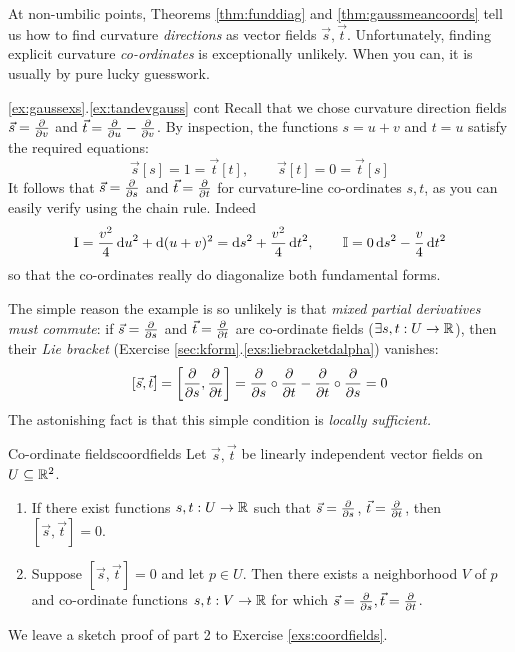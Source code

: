 
At non-umbilic points, Theorems \ref{thm:funddiag} and \ref{thm:gaussmeancoords} tell us how to find curvature \emph{directions} as vector fields $\vec s,\vec t$. Unfortunately, finding explicit curvature \emph{co-ordinates} is exceptionally unlikely. When you can, it is usually by pure lucky guesswork.

\begin{example*}{\ref*{ex:gaussexs}.\ref{ex:tandevgauss} cont}{}
	Recall that we chose curvature direction fields $\vec s=\frac{\partial }{\partial v}$ and $\vec t=\frac{\partial }{\partial u}-\frac{\partial }{\partial v}$. By inspection, the functions $s=u+v$ and $t=u$ satisfy the required equations:
	\[
		\vec s[s]=1=\vec t[t],\qquad \vec s[t]=0=\vec t[s]
	\]
	It follows that $\vec s=\frac{\partial }{\partial s}$ and $\vec t=\frac{\partial }{\partial t}$ for curvature-line co-ordinates $s,t$, as you can easily verify using the chain rule. Indeed
	\[
		\mathrm{I}=\frac{v^2}4\,{\mathrm{d} u}^2+\mathrm{d}(u+v)^2 ={\mathrm{d} s}^2+\frac{v^2}4\,{\mathrm{d} t}^2,\qquad \mathbb{I}=0\,{\mathrm{d} s}^2-\frac v4\,{\mathrm{d} t}^2
	\]
	so that the co-ordinates really do diagonalize both fundamental forms.
\end{example*}

 The simple reason the example is so unlikely is that \emph{mixed partial derivatives must commute}: if $\vec s=\frac{\partial }{\partial s}$ and $\vec t=\frac{\partial }{\partial t}$ are co-ordinate fields ($\exists s,t:U\to\mathbb{R}$), then their \emph{Lie bracket} (Exercise \ref*{sec:kform}.\ref{exs:liebracketdalpha}) vanishes:
\[
	[\vec s,\vec t]=\left[\frac{\partial }{\partial s},\frac{\partial }{\partial t}\right]=\frac{\partial }{\partial s}\circ\frac{\partial }{\partial t}-\frac{\partial }{\partial t}\circ\frac{\partial }{\partial s}=0
\]
The astonishing fact is that this simple condition is \emph{locally sufficient.}

\begin{thm}{Co-ordinate fields}{coordfields}
	Let $\vec s,\vec t$ be linearly independent vector fields on $U\subseteq\mathbb{R}^2$.
	\begin{enumerate}
	  \item If there exist functions $s,t:U\to\mathbb{R}$ such that $\vec s=\frac{\partial }{\partial s}$, $\vec t=\frac{\partial }{\partial t}$, then $[\vec s,\vec t]=0$.
	  \item Suppose $[\vec s,\vec t]=0$ and let $p\in U$. Then there exists a neighborhood $V$ of $p$ and co-ordinate functions $s,t:V\to\mathbb{R}$ for which $\vec s=\frac{\partial }{\partial s},\vec t=\frac{\partial }{\partial t}$.
	\end{enumerate}
\end{thm}

We leave a sketch proof of part 2 to Exercise \ref{exs:coordfields}.\smallbreak

